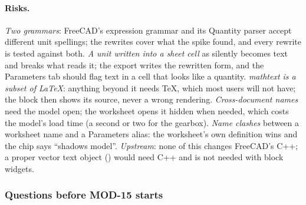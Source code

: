 \paragraph{Risks.} \emph{Two grammars}: FreeCAD's expression grammar and its Quantity parser accept different unit
spellings; the rewrites cover what the spike found, and every rewrite is tested against both. \emph{A unit written
into a sheet cell} as  silently becomes text and breaks what reads it; the export writes the rewritten
form, and the Parameters tab should flag text in a cell that looks like a quantity. \emph{mathtext is a subset of
LaTeX}: anything beyond it needs TeX, which most users will not have; the block then shows its source, never a wrong
rendering. \emph{Cross-document names} need the model open; the worksheet opens it hidden when needed, which costs
the model's load time (a second or two for the gearbox). \emph{Name clashes} between a worksheet name and a
Parameters alias: the worksheet's own definition wins and the chip says ``shadows model''. \emph{Upstream}: none of
this changes FreeCAD's C++; a proper vector text object () would need C++ and is not
needed with block widgets.

\subsubsection*{Questions before MOD-15 starts}

